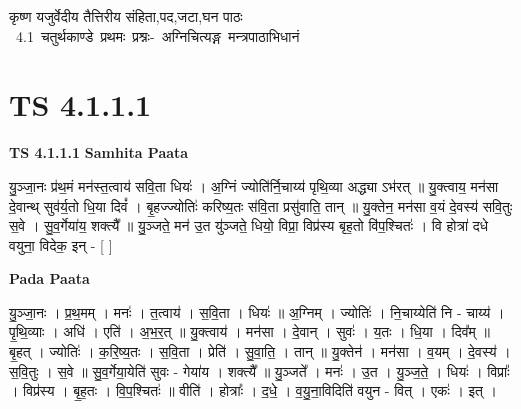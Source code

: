 \documentclass[17pt]{extarticle}
\begin{document}
\begin{titlepage}
    \begin{center}
 
\begin{sanskrit}
    { \Huge
    कृष्ण यजुर्वेदीय तैत्तिरीय संहिता,पद,जटा,घन पाठः 
    }
    \\
    \vspace{2.5cm}
    \mbox{ \Huge
    4.1     चतुर्थकाण्डे प्रथमः प्रश्नः- अग्निचित्यङ्ग मन्त्रपाठाभिधानं   }
\end{sanskrit}
\end{center}

\end{titlepage}
\tableofcontents
\pagebreak

\section*{ TS 4.1.1.1 }

\textbf{TS 4.1.1.1 } \newline
\textbf{Samhita Paata} \newline

यु॒ञ्जा॒नः प्र॑थ॒मं मन॑स्त॒त्वाय॑ सवि॒ता धियः॑ । अ॒ग्निं ज्योति॑र्नि॒चाय्य॑ पृथि॒व्या अद्ध्या ऽभ॑रत् ॥ यु॒क्त्वाय॒ मन॑सा दे॒वान्थ् सुव॑र्य॒तो धि॒या दिवं᳚ । बृ॒हज्ज्योतिः॑ करिष्य॒तः स॑वि॒ता प्रसु॑वाति॒ तान् ॥ यु॒क्तेन॒ मन॑सा व॒यं दे॒वस्य॑ सवि॒तुः स॒वे । सु॒व॒र्गेया॑य॒ शक्त्यै᳚ ॥ यु॒ञ्जते॒ मन॑ उ॒त यु॑ञ्जते॒ धियो॒ विप्रा॒ विप्र॑स्य बृह॒तो वि॑प॒श्चितः॑ । वि होत्रा॑ दधे वयुना॒ विदेक॒ इन् - [  ] \newline

\textbf{Pada Paata} \newline

यु॒ञ्जा॒नः । प्र॒थ॒मम् । मनः॑ । त॒त्वाय॑ । स॒वि॒ता । धियः॑ ॥ अ॒ग्निम् । ज्योतिः॑ । नि॒चाय्येति॑ नि - चाय्य॑ । पृ॒थि॒व्याः । अधि॑ । एति॑ । अ॒भ॒र॒त् ॥ यु॒क्त्वाय॑ । मन॑सा । दे॒वान् । सुवः॑ । य॒तः । धि॒या । दिव᳚म् ॥ बृ॒हत् । ज्योतिः॑ । क॒रि॒ष्य॒तः । स॒वि॒ता । प्रेति॑ । सु॒वा॒ति॒ । तान् ॥ यु॒क्तेन॑ । मन॑सा । व॒यम् । दे॒वस्य॑ । स॒वि॒तुः । स॒वे ॥ सु॒व॒र्गेया॒येति॑ सुवः - गेया॑य । शक्त्यै᳚ ॥ यु॒ञ्जते᳚ । मनः॑ । उ॒त । यु॒ञ्ज॒ते॒ । धियः॑ । विप्राः᳚ । विप्र॑स्य । बृ॒ह॒तः । वि॒प॒श्चितः॑ ॥ वीति॑ । होत्राः᳚ । द॒धे॒ । व॒यु॒ना॒विदिति॑ वयुन - वित् । एकः॑ । इत् ।  \newline




\end{document}
